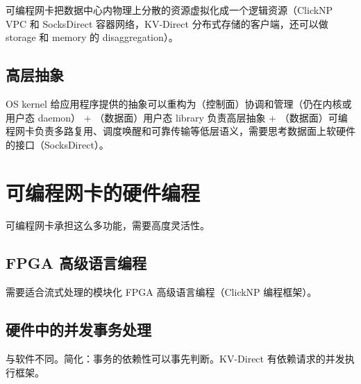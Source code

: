 可编程网卡把数据中心内物理上分散的资源虚拟化成一个逻辑资源（ClickNP VPC 和 SocksDirect 容器网络，KV-Direct 分布式存储的客户端，还可以做 storage 和 memory 的 disaggregation）。

\subsection{高层抽象}

OS kernel 给应用程序提供的抽象可以重构为（控制面）协调和管理（仍在内核或用户态 daemon） + （数据面）用户态 library 负责高层抽象 + （数据面）可编程网卡负责多路复用、调度唤醒和可靠传输等低层语义，需要思考数据面上软硬件的接口（SocksDirect）。

\section{可编程网卡的硬件编程}

可编程网卡承担这么多功能，需要高度灵活性。

\subsection{FPGA 高级语言编程}

需要适合流式处理的模块化 FPGA 高级语言编程（ClickNP 编程框架）。

\subsection{硬件中的并发事务处理}

与软件不同。简化：事务的依赖性可以事先判断。KV-Direct 有依赖请求的并发执行框架。